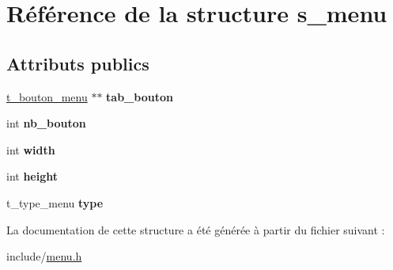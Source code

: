 \hypertarget{structs__menu}{}\section{Référence de la structure s\+\_\+menu}
\label{structs__menu}
\subsection*{Attributs publics}
\begin{DoxyCompactItemize}
\item 
\mbox{\label{structs__menu_a2db9c68c4c3320c6072e23b4b0468c61}} 
\hyperlink{structt__bouton__menu}{t\+\_\+bouton\+\_\+menu} $\ast$$\ast$ {\bfseries tab\+\_\+bouton}
\item 
\mbox{\label{structs__menu_a7f7706a4a3c786c0d6f9bcf2da68b075}} 
int {\bfseries nb\+\_\+bouton}
\item 
\mbox{\label{structs__menu_a69e96e7d4b40c64d1d0fad072a6cbd0d}} 
int {\bfseries width}
\item 
\mbox{\label{structs__menu_a7ebf378ecae3391c2d3a5913f1d14a50}} 
int {\bfseries height}
\item 
\mbox{\label{structs__menu_a74d7b2ea1acba513bb4ec39a0ee161f5}} 
t\+\_\+type\+\_\+menu {\bfseries type}
\end{DoxyCompactItemize}


La documentation de cette structure a été générée à partir du fichier suivant \+:\begin{DoxyCompactItemize}
\item 
include/\hyperlink{menu_8h}{menu.\+h}\end{DoxyCompactItemize}
